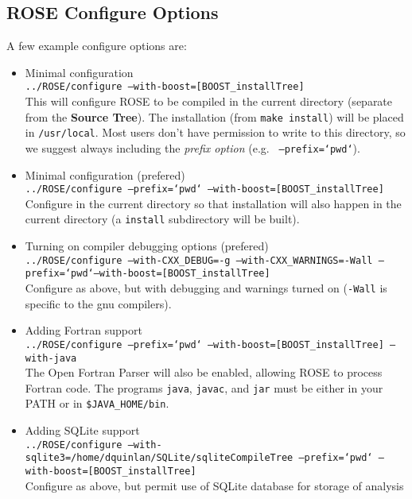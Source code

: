 \subsection{ROSE Configure Options}
\label{gettingStarted:configureOptions}
     A few example configure options are:
\begin{itemize}
   \item Minimal configuration \\
         {\tt ../ROSE/configure --with-boost=[BOOST\_installTree]} \\
         This will configure ROSE to be compiled in the current directory (separate from
         the {\bf Source Tree}).  The installation (from {\tt make install}) will be placed in
         {\tt /usr/local}.  Most users don't have permission to write to this directory,
         so we suggest always including the {\em prefix option} (e.g. {\tt
         --prefix=`pwd`}).
   \item Minimal configuration (prefered) \\
         {\tt ../ROSE/configure --prefix=`pwd` --with-boost=[BOOST\_installTree]} \\
         Configure in the current directory so that installation will also happen in the
         current  directory (a {\tt install} subdirectory will be built).
   \item Turning on compiler debugging options (prefered) \\
         {\tt ../ROSE/configure --with-CXX\_DEBUG=-g --with-CXX\_WARNINGS=-Wall --prefix=`pwd`--with-boost=[BOOST\_installTree]} \\
         Configure as above, but with debugging and warnings turned on ({\tt -Wall} is
         specific to the gnu compilers).
   \item Adding Fortran support \\
         {\tt ../ROSE/configure --prefix=`pwd` --with-boost=[BOOST\_installTree] --with-java} \\
         The Open Fortran Parser will also be enabled, allowing ROSE to process Fortran
         code.  The programs {\tt java}, {\tt javac}, and {\tt jar} must be either in your 
         PATH or in {\tt \$JAVA\_HOME/bin}.
   \item Adding SQLite support \\
         {\tt ../ROSE/configure --with-sqlite3=/home/dquinlan/SQLite/sqliteCompileTree --prefix=`pwd` --with-boost=[BOOST\_installTree]} \\
         Configure as above, but permit use of SQLite database for storage of analysis

\end{itemize}
